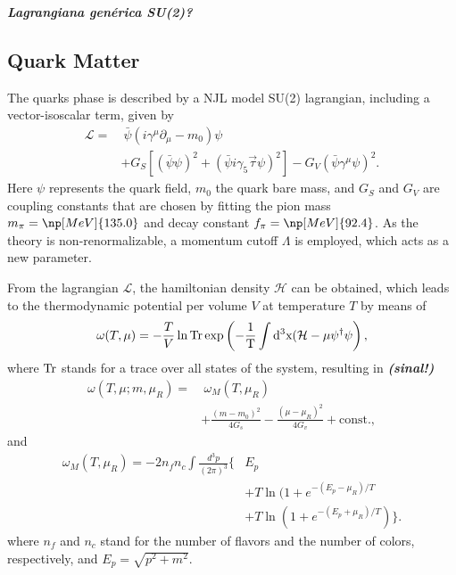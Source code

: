 \documentclass[prc, reprint, amsmath, linenumbers,10pt]{revtex4-1}
\newcommand{\tr}{\rm{Tr}}
\newcommand{\comment}[1]{{\bf\textit{#1}}}
\begin{document}
\comment{Lagrangiana genérica SU(2)?}

\subsection{Quark Matter}

The quarks phase is described by a NJL model SU(2) lagrangian, including a vector-isoscalar term, given by\cite{Buballa2005}
\begin{equation}\label{Eq:LagNJL-SU2-Bub}
\begin{split}
	\mathcal{L} =&~ \bar{\psi}(i\gamma^\mu\partial_\mu - m_0)\psi \\
	&+ G_S[(\bar{\psi}\psi)^2 + (\bar{\psi}i\gamma_5\vec{\tau}\psi)^2] - G_V(\bar{\psi}\gamma^\mu \psi)^2.
\end{split}
\end{equation}
%
Here $\psi$ represents the quark field, $m_0$ the quark bare mass, and $G_S$ and $G_V$ are coupling constants that are chosen by fitting the pion mass $m_\pi = \np[MeV]{135.0}$ and decay constant $f_\pi = \np[MeV]{92.4}$. As the theory is non-renormalizable, a momentum cutoff $\Lambda$ is employed, which acts as a new parameter.

From the lagrangian $\mathcal{L}$, the hamiltonian density $\mathcal{H}$ can be obtained, which leads to the thermodynamic potential per volume $V$ at temperature $T$ by means of
\begin{equation}
	\omega(T, \mu) = -\frac{T}{V} \ln \tr \exp\left(-\frac{1}{T}\int d^3x(\mathcal{H} - \mu\psi^\dagger\psi\right),
\end{equation}
%
where $\tr$ stands for a trace over all states of the system, resulting in \comment{(sinal!)}
\begin{equation}\label{Eq:Pot_Termo_Temp_Finita}
\begin{split}
	\omega(T, \mu; m, \mu_R) =&~ \omega_M(T, \mu_R) \\
	&+ \frac{(m - m_0)^2}{4G_s} - \frac{(\mu - \mu_R)^2}{4G_v} +  \textrm{const.},
\end{split}
\end{equation}
and
\begin{equation}
\begin{split}\label{Eq:Por_Termo_Temp_Finita_Fermi_Gas_Contrib}
	\omega_M(T, \mu_R) = -2 n_f n_c \int \frac{d^3p}{(2\pi)^3} \{&E_p \\
	&+ T\ln(1+e^{-(E_p-\mu_R)/T} \\
	&+ T\ln(1 + e^{-(E_p+\mu_R)/T})\}.
\end{split}
\end{equation}
%
where $n_f$ and $n_c$ stand for the number of flavors and the number of colors, respectively, and $E_p = \sqrt{p^2 + m^2}$.
\end{document}

